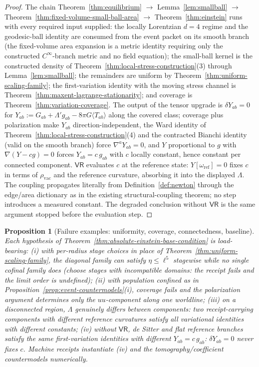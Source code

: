 \documentclass[11pt]{article}
\newtheorem{proposition}[theorem]{Proposition}
\begin{document}
\begin{proof}
The chain Theorem~\ref{thm:equilibrium} \(\to\) Lemma~\ref{lem:smallball}
\(\to\) Theorem~\ref{thm:fixed-volume-small-ball-area} \(\to\)
Theorem~\ref{thm:einstein} runs with every required input
supplied: the locally Lorentzian \(d=4\) regime and the geodesic-ball
identity are consumed from the event packet on its smooth branch (the
fixed-volume area expansion is a metric identity requiring only the
constructed \(C^\infty\)-branch metric and no field equation); the
small-ball kernel is the constructed density of
Theorem~\ref{thm:local-stress-construction}(3) through
Lemma~\ref{lem:smallball}; the remainders are uniform by
Theorem~\ref{thm:uniform-scaling-family}; the first-variation identity with
the moving stress channel is Theorem~\ref{thm:maxent-lagrange-stationarity};
and coverage is Theorem~\ref{thm:variation-coverage}. The output of the
tensor upgrade is \(\delta Y_{ab}=0\) for
\(Y_{ab}:=G_{ab}+\Lambda' g_{ab}-8\pi G\langle T_{ab}\rangle\) along the
covered class; coverage plus polarization make \(Y_{ab}\) direction-independent,
the Ward identity of Theorem~\ref{thm:local-stress-construction}(4) and the
contracted Bianchi identity (valid on the smooth branch) force
\(\nabla^aY_{ab}=0\), and \(Y\) proportional to \(g\) with
\(\nabla(Y-cg)=0\) forces \(Y_{ab}=c\,g_{ab}\) with \(c\) locally constant,
hence constant per connected component. \(\mathsf{VR}\) evaluates \(c\) at
the reference state: \(Y[\omega_{\mathrm{ref}}]=0\) fixes \(c\) in terms of
\(\rho_{\mathrm{vac}}\) and the reference curvature, absorbing it into the
displayed \(\Lambda\). The coupling propagates literally from
Definition~\ref{def:newton} through the edge/area dictionary as in the
existing structural-coupling theorem; no step introduces a measured
constant. The degraded conclusion without \(\mathsf{VR}\) is the same
argument stopped before the evaluation step.
\end{proof}

\begin{proposition}[Failure examples: uniformity, coverage, connectedness, baseline]
\label{prop:baseline-countermodels}
Each hypothesis of Theorem~\ref{thm:absolute-einstein-base-condition} is
load-bearing:
(i) with per-radius stage choices in place of
Theorem~\ref{thm:uniform-scaling-family}, the diagonal family can satisfy
\(\eta\leq\ell^5\) stagewise while no single cofinal family does (choose
stages with incompatible domains: the receipt fails and the limit order is
undefined);
(ii) with population confined as in
Proposition~\ref{prop:event-countermodels}(i), coverage fails and the
polarization argument determines only the \(uu\)-component along one
worldline;
(iii) on a disconnected region, \(\Lambda\) genuinely differs between
components: two receipt-carrying components with different reference
curvatures satisfy all variational identities with different constants;
(iv) without \(\mathsf{VR}\), de Sitter and flat reference branches satisfy
the \emph{same} first-variation identities with different \(Y_{ab}=c\,g_{ab}\):
\(\delta Y_{ab}=0\) never fixes \(c\). Machine receipts instantiate (iv) and
the tomography/coefficient countermodels numerically.
\end{proposition}
\end{document}

